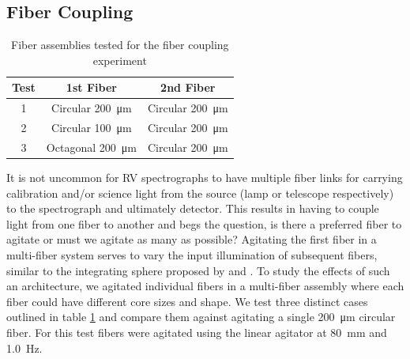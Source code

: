 \documentclass[twocolumn]{emulateapj}
\begin{document}
\subsection{Fiber Coupling}

\begin{table}
\centering
\caption{Fiber assemblies tested for the fiber coupling experiment}
	\begin{tabular}{ccc}
	\hline
	Test & 1st Fiber & 2nd Fiber \\
	\hline \hline
	1 & Circular \SI{200}{\micro\meter} & Circular \SI{200}{\micro\meter} \\
	\hline
	2 & Circular \SI{100}{\micro\meter} & Circular \SI{200}{\micro\meter} \\
	\hline
	3 & Octagonal \SI{200}{\micro\meter} & Circular \SI{200}{\micro\meter} \\
	\hline
	\end{tabular}
\label{table:fiber_coupling}
\end{table}


It is not uncommon for RV spectrographs to have multiple fiber links for carrying calibration and/or science light from the source (lamp or telescope respectively) to the spectrograph and ultimately detector. This results in having to couple light from one fiber to another and begs the question, is there a preferred fiber to agitate or must we agitate as many as possible? Agitating the first fiber in a multi-fiber system serves to vary the input illumination of subsequent fibers, similar to the integrating sphere proposed by \citep{Mahadevan2014} and \citep{Halverson2014}. To study the effects of such an architecture, we agitated individual fibers in a multi-fiber assembly where each fiber could have different core sizes and shape. We test three distinct cases outlined in table \ref{table:fiber_coupling} and compare them against agitating a single \SI{200}{\micro\meter} circular fiber. For this test fibers were agitated using the linear agitator at \SI{80}{\milli\meter} and \SI{1.0}{\hertz}.
\end{document}
